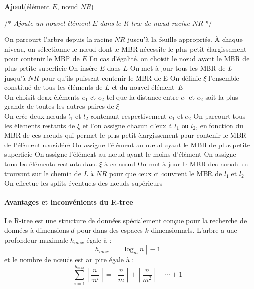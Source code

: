\begin{algorithm}
\caption{\textbf{Ajout}(élément $E$, nœud $NR$)}
/* \textit{Ajoute un nouvel élément $E$ dans le R-tree de nœud racine $NR$} */
\label{algo:ajout}
\begin{algorithmic}[1]
\STATE On parcourt l'arbre depuis la racine $NR$ jusqu'à la feuille appropriée. À chaque niveau, on sélectionne le nœud dont le MBR nécessite le plus petit élargissement pour contenir le MBR de $E$
\STATE En cas d'égalité, on choisit le nœud ayant le MBR de plus petite \og superficie \fg{}
  \STATE On insère $E$ dans $L$
  \STATE On met à jour tous les MBR de $L$ jusqu'à $NR$ pour qu'ils puissent contenir le MBR de E 
  \STATE On définie $\xi$ l'ensemble constitué de tous les éléments de $L$ et du nouvel élément~$E$\\
On choisit deux éléments $e_1$ et $e_2$ tel que la distance entre $e_1$ et $e_2$ soit la plus grande de toutes les autres paires de $\xi$\\
On crée deux nœuds $l_1$ et $l_2$ contenant respectivement $e_1$ et $e_2$
  \STATE On parcourt tous les éléments restants de $\xi$ et l'on assigne chacun d'eux à $l_1$ ou $l_2$, en fonction du MBR de ces nœuds qui permet le plus petit élargissement pour contenir le MBR de l'élément considéré
    \STATE On assigne l'élément au nœud ayant le MBR de plus petite superficie
      \STATE On assigne l'élément au nœud ayant le moins d'élément
    \ENDIF
  \ENDIF
    \STATE On assigne tous les éléments restants dans $\xi$ à ce nœud
  \ENDIF
  \STATE On met à jour le MBR des nœuds se trouvant sur le chemin de $L$ à $NR$ pour que ceux ci couvrent le MBR de $l_1$ et $l_2$
  \STATE On effectue les \og splits \fg{} éventuels des nœuds supérieurs
\ENDIF 
\end{algorithmic}
\end{algorithm}


\paragraph{Avantages et inconvénients du R-tree} Le R-tree est une structure de données spécialement conçue pour la recherche de données à dimensions $d$ pour dans des espaces $k$-dimensionnels. L'arbre a une profondeur maximale $h_{max}$ égale à :
\begin{equation}
 h_{max} = \left\lceil\log_{m} n\right\rceil - 1
\end{equation}
et le nombre de nœuds est au pire égale à :
\begin{equation}
 \sum_{i=1}^{h_{max}}{\left\lceil\frac{n}{m^i}\right\rceil} = \left\lceil\frac{n}{m}\right\rceil + \left\lceil\frac{n}{m^2}\right\rceil + \cdots + 1
\end{equation}

